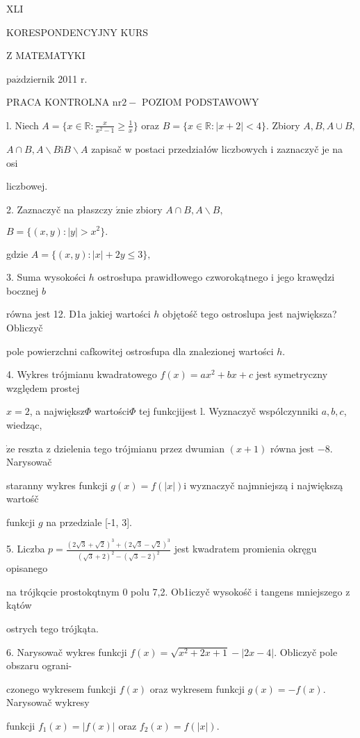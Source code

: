 \documentclass[a4paper,12pt]{article}
\begin{document}
XLI

KORESPONDENCYJNY KURS

Z MATEMATYKI

$\mathrm{p}\mathrm{a}\acute{\mathrm{z}}$dziernik 2011 $\mathrm{r}.$

PRACA KONTROLNA $\mathrm{n}\mathrm{r} 2-$ POZIOM PODSTAWOWY

l. Niech $A=\displaystyle \{x\in \mathbb{R}:\frac{x}{x^{2}-1}\geq\frac{1}{x}\}$ oraz $B=\{x\in \mathbb{R}:|x+2|<4\}$. Zbiory $A, B, A\cup B,$

$A\cap B, A\backslash B\mathrm{i}B\backslash A$ zapisač $\mathrm{w}$ postaci przedziałów liczbowych $\mathrm{i}$ zaznaczyč je na osi

liczbowej.

2. Zaznaczyč na płaszczy $\acute{\mathrm{z}}\mathrm{n}\mathrm{i}\mathrm{e}$ zbiory $A\cap B, A\backslash B,$

$B=\{(x,y):|y|>x^{2}\}.$

gdzie $A = \{(x,y):|x|+2y\leq 3\},$

3. Suma wysokości $h$ ostrosłupa prawidłowego czworokątnego $\mathrm{i}$ jego krawędzi bocznej $b$

równa jest 12. D1a jakiej wartości $h$ objętośč tego ostroslupa jest największa? Obliczyč

pole powierzchni cafkowitej ostrosfupa dla znalezionej wartości $h.$

4. Wykres trójmianu kwadratowego $f(x)=ax^{2}+bx+c$ jest symetryczny względem prostej

$x=2$, a największ$\Phi$ wartości$\Phi$ tej funkcjijest l. Wyznaczyč wspólczynniki $a, b, c$, wiedząc,

$\dot{\mathrm{z}}\mathrm{e}$ reszta $\mathrm{z}$ dzielenia tego trójmianu przez dwumian $(x+1)$ równa jest $-8$. Narysowač

staranny wykres funkcji $g(x) = f(|x|) \mathrm{i}$ wyznaczyč najmniejszą $\mathrm{i}$ największą wartośč

funkcji $g$ na przedziale [-1, 3].

5. Liczba $p=\displaystyle \frac{(2\sqrt{3}+\sqrt{2})^{3}+(2\sqrt{3}-\sqrt{2})^{3}}{(\sqrt{3}+2)^{2}-(\sqrt{3}-2)^{2}}$ jest kwadratem promienia okręgu opisanego

na trójkqcie prostokqtnym $0$ polu 7,2. Ob1iczyč wysokośč $\mathrm{i}$ tangens mniejszego $\mathrm{z}$ kątów

ostrych tego trójkąta.

6. Narysowač wykres funkcji $f(x)=\sqrt{x^{2}+2x+1}-|2x-4|$. Obliczyč pole obszaru ograni-

czonego wykresem funkcji $f(x)$ oraz wykresem funkcji $g(x)=-f(x)$. Narysowač wykresy

funkcji $f_{1}(x)=|f(x)|$ oraz $f_{2}(x)=f(|x|).$
\end{document}
